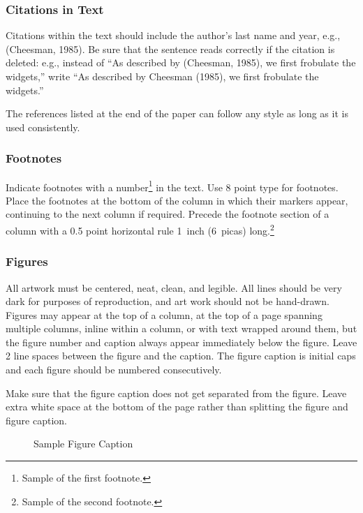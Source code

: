 \documentclass[twoside]{article}
\begin{document}
\subsubsection{Citations in Text}

Citations within the text should include the author's last name and
year, e.g., (Cheesman, 1985). 
Be sure that the sentence reads
correctly if the citation is deleted: e.g., instead of ``As described
by (Cheesman, 1985), we first frobulate the widgets,'' write ``As
described by Cheesman (1985), we first frobulate the widgets.''


The references listed at the end of the paper can follow any style as long as it is used consistently.


\subsubsection{Footnotes}

Indicate footnotes with a number\footnote{Sample of the first
  footnote.} in the text. Use 8 point type for footnotes. Place the
footnotes at the bottom of the column in which their markers appear,
continuing to the next column if required. Precede the footnote
section of a column with a 0.5 point horizontal rule 1~inch (6~picas)
long.\footnote{Sample of the second footnote.}

\subsubsection{Figures}

All artwork must be centered, neat, clean, and legible.  All lines
should be very dark for purposes of reproduction, and art work should
not be hand-drawn.  Figures may appear at the top of a column, at the
top of a page spanning multiple columns, inline within a column, or
with text wrapped around them, but the figure number and caption
always appear immediately below the figure.  Leave 2 line spaces
between the figure and the caption. The figure caption is initial caps
and each figure should be numbered consecutively.

Make sure that the figure caption does not get separated from the
figure. Leave extra white space at the bottom of the page rather than
splitting the figure and figure caption.
\begin{figure}[h]
\vspace{.3in}
\centerline{}
\vspace{.3in}
\caption{Sample Figure Caption}
\end{figure}
\end{document}
